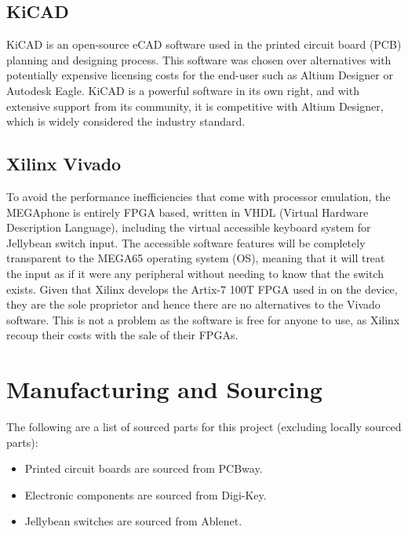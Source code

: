 \subsection{KiCAD}

KiCAD is an open-source eCAD software used in the printed circuit board (PCB) planning and designing process.
This software was chosen over alternatives with potentially expensive licensing costs for the end-user such as Altium Designer or Autodesk Eagle.
KiCAD is a powerful software in its own right, and with extensive support from its community, it is competitive with Altium Designer, which is widely considered the industry standard.


\subsection{Xilinx Vivado}

To avoid the performance inefficiencies that come with processor emulation, the MEGAphone is entirely FPGA based, written in VHDL (Virtual Hardware Description Language), including the virtual accessible keyboard system for Jellybean switch input.
The accessible software features will be completely transparent to the MEGA65 operating system (OS), meaning that it will treat the input as if it were any peripheral without needing to know that the switch exists.
Given that Xilinx develops the Artix-7 100T FPGA used in on the device, they are the sole proprietor and hence there are no alternatives to the Vivado software.
This is not a problem as the software is free for anyone to use, as Xilinx recoup their costs with the sale of their FPGAs.


\section{Manufacturing and Sourcing}

The following are a list of sourced parts for this project (excluding locally sourced parts):

\begin{itemize} 
    \item Printed circuit boards are sourced from PCBway. %
    \item Electronic components are sourced from Digi-Key.
    \item Jellybean switches are sourced from Ablenet.
    \end{itemize}

